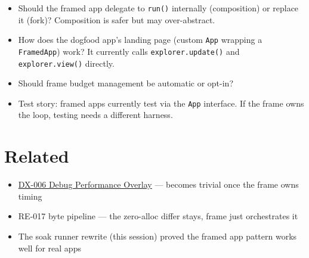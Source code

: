 \begin{itemize}
\tightlist
\item
  Should the framed app delegate to \texttt{r\allowbreak{}u\allowbreak{}n\allowbreak{}(\allowbreak{})} internally (composition) or replace it (fork)? Composition is safer but may over-abstract.
\item
  How does the dogfood app's landing page (custom \texttt{A\allowbreak{}p\allowbreak{}p} wrapping a \texttt{F\allowbreak{}r\allowbreak{}a\allowbreak{}m\allowbreak{}e\allowbreak{}d\allowbreak{}A\allowbreak{}p\allowbreak{}p}) work? It currently calls \texttt{e\allowbreak{}x\allowbreak{}p\allowbreak{}l\allowbreak{}o\allowbreak{}r\allowbreak{}e\allowbreak{}r\allowbreak{}.\allowbreak{}u\allowbreak{}p\allowbreak{}d\allowbreak{}a\allowbreak{}t\allowbreak{}e\allowbreak{}(\allowbreak{})} and \texttt{e\allowbreak{}x\allowbreak{}p\allowbreak{}l\allowbreak{}o\allowbreak{}r\allowbreak{}e\allowbreak{}r\allowbreak{}.\allowbreak{}v\allowbreak{}i\allowbreak{}e\allowbreak{}w\allowbreak{}(\allowbreak{})} directly.
\item
  Should frame budget management be automatic or opt-in?
\item
  Test story: framed apps currently test via the \texttt{A\allowbreak{}p\allowbreak{}p} interface. If the frame owns the loop, testing needs a different harness.
\end{itemize}

\section{Related}\label{record-372-related}

\begin{itemize}
\tightlist
\item
  \href{https://github.com/flyingrobots/bijou/blob/cbd70612140e7a450d764b3c7be1c6af878b99bc/docs/method/graveyard/legacy-backlog/v5.0.0/DX_006-debug-performance-overlay-component.md}{DX-006 Debug Performance Overlay} --- becomes trivial once the frame owns timing
\item
  RE-017 byte pipeline --- the zero-alloc differ stays, frame just orchestrates it
\item
  The soak runner rewrite (this session) proved the framed app pattern works well for real apps
\end{itemize}

